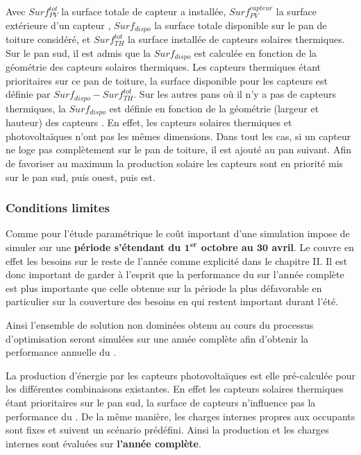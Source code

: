 Avec $Surf_{PV}^{tot}$ la surface totale de capteur  a installée,
$Surf_{PV}^{capteur}$ la surface extérieure d’un capteur , $Surf_{dispo}$ la
surface totale disponible sur le pan de toiture considéré, et $Surf_{TH}^{tot}$ la surface
installée de capteurs solaires thermiques. Sur le pan sud, il est admis que
la $Surf_{dispo}$ est calculée en fonction de la géométrie des capteurs solaires
thermiques. Les capteurs thermiques étant prioritaires sur ce pan de toiture, la surface
disponible pour les capteurs  est définie par $Surf_{dispo} - Surf_{TH}^{tot}$.
Sur les autres pans où il n’y a pas de capteurs thermiques, la $Surf_{dispo}$ est
définie en fonction de la géométrie (largeur et hauteur) des capteurs . En effet,
les capteurs solaires thermiques et photovoltaïques n’ont pas les mêmes dimensions.
Dans tout les cas, si un capteur ne loge pas complètement sur le pan de toiture,
il est ajouté au pan suivant. Afin de favoriser au maximum la production solaire
les capteurs sont en priorité mis sur le pan sud, puis ouest, puis est.


\subsubsection{Conditions limites} %
\label{ssub:conditions_limites}
Comme pour l’étude paramétrique le coût important d’une simulation impose de simuler
sur une \textbf{période s’étendant du $\bm{1^{er}}$ octobre au $\bm{30}$ avril}. Le 
couvre en effet les besoins sur le reste de l’année comme explicité dans le chapitre II.
Il est donc important de garder à l’esprit que la performance du  sur l’année
complète est plus importante que celle obtenue sur la période la plus défavorable en
particulier sur la couverture des besoins en  qui restent important durant
l’été.

Ainsi l’ensemble de solution non dominées obtenu au cours du processus d’optimisation
seront simulées sur une année complète afin d’obtenir la performance annuelle du .

La production d’énergie par les capteurs photovoltaïques est elle pré-calculée pour
les différentes combinaisons existantes. En effet les capteurs solaires thermiques
étant prioritaires sur le pan sud, la surface de capteurs  n’influence
pas la performance du . De la même manière, les charges internes propres
aux occupants sont fixes et suivent un scénario prédéfini. Ainsi la production
 et les charges internes sont évaluées sur \textbf{l’année complète}.

